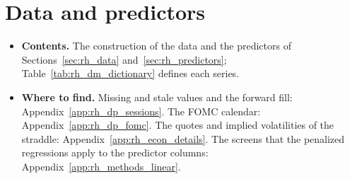\section{Data and predictors}
\label{app:rh_data}
\begin{itemize}
\item \textbf{Contents.} The construction of the data and the predictors of Sections~\ref{sec:rh_data}
  and~\ref{sec:rh_predictors}; Table~\ref{tab:rh_dm_dictionary} defines each series.
\item \textbf{Where to find.} Missing and stale values and the forward fill: Appendix~\ref{app:rh_dp_sessions}. The
  FOMC calendar: Appendix~\ref{app:rh_dp_fomc}. The quotes and implied volatilities of the straddle:
  Appendix~\ref{app:rh_econ_details}. The screens that the penalized regressions apply to the predictor columns:
  Appendix~\ref{app:rh_methods_linear}.
\end{itemize}
